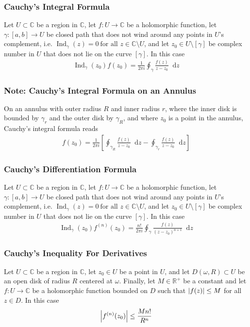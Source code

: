 \documentclass[11pt, a4paper]{article}
\newcommand{\diff}{\mathop{}\!\mathrm{d}} %
\newcommand{\R}{\mathbb{R}} %
\newcommand{\C}{\mathbb{C}} %
\begin{document}
\subsubsection{Cauchy's Integral Formula}
Let $ U \subset \C $ be a region in $ \C $, let $ f: U \to \C $ be a holomorphic function, let $ \gamma : [a, b] \to U $ be closed path that does not wind around any points in $ U $'s complement, i.e. $ 	\operatorname{Ind}_{\gamma}(z) = 0 \ \text{for all } z \in \C \setminus U $, and let $ z_0 \in U \setminus [\gamma] $ be complex number in $ U $ that does not lie on the curve $ [\gamma] $. In this case
\begin{align*}
	\operatorname{Ind}_{\gamma}(z_0) f(z_0) = \frac{1}{2\pi i} \oint_{\gamma} \frac{f(z)}{z - z_0} \diff z
\end{align*}

\subsubsection{Note: Cauchy's Integral Formula on an Annulus}
On an annulus with outer radius $ R $ and inner radius $ r $, where the inner disk is bounded by $ \gamma_r $ and the outer disk by $ \gamma_R $, and where $ z_0 $ is a point in the annulus, Cauchy's integral formula reads
\begin{align*}
	f(z_0) = \frac{1}{2\pi i} \left[\oint_{\gamma_R} \frac{f(z)}{z - z_0} \diff z - \oint_{\gamma_r} \frac{f(z)}{z - z_0} \diff z \right]
\end{align*}

\subsubsection{Cauchy's Differentiation Formula}
Let $ U \subset \C $ be a region in $ \C $, let $ f: U \to \C $ be a holomorphic function, let $ \gamma : [a, b] \to U $ be closed path that does not wind around any points in $ U $'s complement, i.e. $ 	\operatorname{Ind}_{\gamma}(z) = 0 \ \text{for all } z \in \C \setminus U $, and let $ z_0 \in U \setminus [\gamma] $ be complex number in $ U $ that does not lie on the curve $ [\gamma] $. In this case
\begin{align*}
	\operatorname{Ind}_{\gamma}(z_0) f^{(n)}(z_0) = \frac{n!}{2\pi i} \oint_{\gamma} \frac{f(z)}{(z - z_0)^{n+1}} \diff z
\end{align*}

\subsubsection{Cauchy's Inequality For Derivatives}
Let $ U \subset \C $ be a region in $ \C $, let $ z_0 \in U $ be a point in $ U $, and let $ D(\omega, R) \subset U $ be an open disk of radius $ R $ centered at $ \omega $. Finally, let $ M \in \R^{+} $ be a constant and let $ f: U \to \C $ be a holomorphic function bounded on $ D $ such that $ \abs{f(z)} \leq M $ for all $ z \in D $. In this case
\begin{align*}
	\abs{f^{(n)}(z_0)} \leq \frac{M n!}{R^n}
\end{align*}
\end{document}
